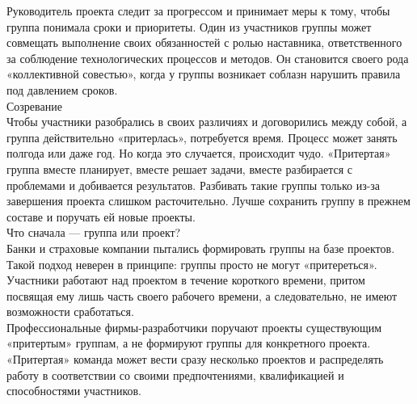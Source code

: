 \documentclass{../industrial-development}
\begin{document}
Руководитель проекта следит за прогрессом и принимает меры к тому, чтобы группа понимала сроки и приоритеты. Один из участников группы может совмещать выполнение своих обязанностей с ролью наставника, ответственного за соблюдение технологических процессов и методов. Он становится своего рода «коллективной совестью», когда у группы возникает соблазн нарушить правила под давлением сроков.\\
Созревание\\
Чтобы участники разобрались в своих различиях и договорились между собой, а группа действительно «притерлась», потребуется время. Процесс может занять полгода или даже год. Но когда это случается, происходит чудо. «Притертая» группа вместе планирует, вместе решает задачи, вместе разбирается с проблемами и добивается результатов. Разбивать такие группы только из-за завершения проекта слишком расточительно. Лучше сохранить группу в прежнем составе и поручать ей новые проекты.\\
Что сначала — группа или проект?\\
Банки и страховые компании пытались формировать группы на базе проектов. Такой подход неверен в принципе: группы просто не могут «притереться». Участники работают над проектом в течение короткого времени, притом посвящая ему лишь часть своего рабочего времени, а следовательно, не имеют возможности сработаться.\\
Профессиональные фирмы-разработчики поручают проекты существующим «притертым» группам, а не формируют группы для конкретного проекта. «Притертая» команда может вести сразу несколько проектов и распределять работу в соответствии со своими предпочтениями, квалификацией и способностями участников.
\end{document}
